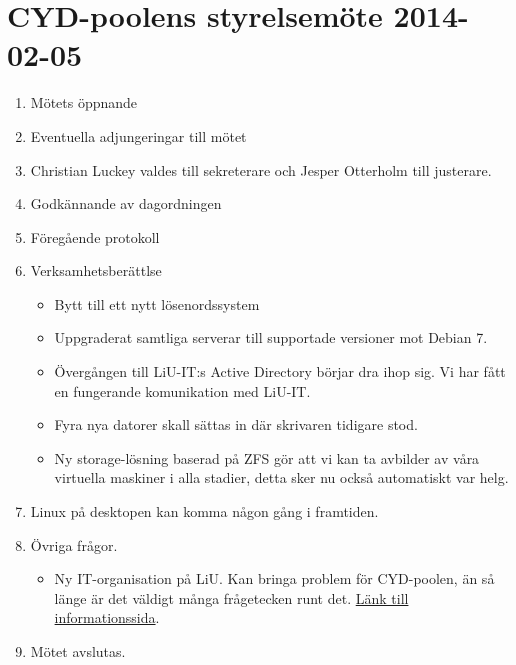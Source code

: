 \documentclass[a4paper,12pt]{article}
\begin{document}
\section{CYD-poolens styrelsemöte 2014-02-05}

\begin{enumerate}
\item Mötets öppnande
\item Eventuella adjungeringar till mötet
\item Christian Luckey valdes till sekreterare och Jesper Otterholm till justerare.
\item Godkännande av dagordningen
\item Föregående protokoll
\item Verksamhetsberättlse
  \begin{itemize}
    \item Bytt till ett nytt lösenordssystem
    \item Uppgraderat samtliga serverar till supportade versioner mot Debian 7.
    \item Övergången till LiU-IT:s Active Directory börjar dra ihop sig. Vi har fått en fungerande komunikation med LiU-IT.
    \item Fyra nya datorer skall sättas in där skrivaren tidigare stod.
    \item Ny storage-lösning baserad på ZFS gör att vi kan ta avbilder av våra virtuella maskiner i alla stadier, detta sker nu också automatiskt var helg.
  \end{itemize}
\item Linux på desktopen kan komma någon gång i framtiden.
\item Övriga frågor.
  \begin{itemize}
  \item Ny IT-organisation på LiU. Kan bringa problem för CYD-poolen, än så länge är det väldigt många frågetecken runt det. \href{https://www.liu.se/insidan/it/ettit?l=sv}{Länk till informationssida}.
  \end{itemize}
\item Mötet avslutas.
\end{enumerate}
\end{document}

